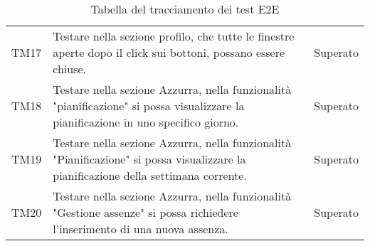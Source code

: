 \begin{table}[h]
\begin{tabularx}{\textwidth}{c X c}
		TM17 & Testare nella sezione profilo, che tutte le finestre aperte dopo il click sui bottoni, possano essere chiuse. & Superato\\
		TM18 & Testare nella sezione Azzurra, nella funzionalità "pianificazione" si possa visualizzare la pianificazione in uno specifico giorno. & Superato\\
		TM19 & Testare nella sezione Azzurra, nella funzionalità "Pianificazione" si possa visualizzare la pianificazione della settimana corrente. & Superato\\
		TM20 & Testare nella sezione Azzurra, nella funzionalità "Gestione assenze" si possa richiedere l'inserimento di una nuova assenza. & Superato\\
		\hline
	\end{tabularx} \hbox{}
	\caption{Tabella del tracciamento dei test E2E}
\end{table}%

